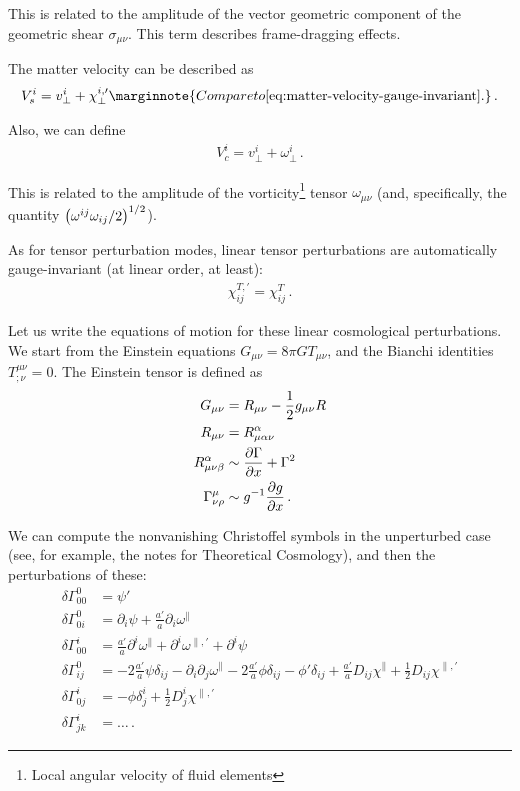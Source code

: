 \documentclass[main.tex]{subfiles}
\begin{document}
This is related to the amplitude of the vector geometric component of the geometric shear \(\sigma_{\mu \nu }\). 
This term describes frame-dragging effects. 

The matter velocity can be described as 
%
\begin{align}
V^{i}_{s} = v^{i}_{\perp} + \chi^{i, \prime}_{\perp}
\marginnote{Compare to \eqref{eq:matter-velocity-gauge-invariant}.}
\,.
\end{align}

Also, we can define 
%
\begin{align}
V^{i}_{c} = v^{i}_{\perp} + \omega^{i}_{\perp}
\,.
\end{align}

This is related to the amplitude of the vorticity\footnote{Local angular velocity of fluid elements} tensor \(\omega_{\mu \nu }\) (and, specifically, the quantity \(\qty(\omega^{ij} \omega_{ij} / 2)^{1/2}\)). 

As for tensor perturbation modes, linear tensor perturbations are automatically gauge-invariant (at linear order, at least): 
%
\begin{align}
\chi^{T, \prime}_{ij} =
\chi^{T}_{ij} 
\,.
\end{align}

Let us write the equations of motion for these linear cosmological perturbations. 
We start from the Einstein equations \(G_{\mu \nu } = 8 \pi G T_{\mu \nu }\), and the Bianchi identities \(T^{\mu \nu }_{; \nu } = 0\). 
The Einstein tensor is defined as 
%
\begin{align}
G_{\mu \nu } &= R_{\mu \nu } - \frac{1}{2} g_{\mu \nu } R  \\
R_{\mu \nu } &= R^{\alpha }_{\mu \alpha \nu }  \\
R^{\alpha }_{\mu \nu \beta }&\sim \pdv{\Gamma }{x} + \Gamma^2  \\
\Gamma^{\mu }_{\nu \rho } &\sim g^{-1} \pdv{g}{x}
\,.
\end{align}

We can compute the nonvanishing Christoffel symbols in the unperturbed case (see, for example, the notes for Theoretical Cosmology), and then the perturbations of these: 
%
\begin{align}
\delta \Gamma^{0}_{00} &= \psi '  \\
\delta \Gamma^{0}_{0i} &= \partial_{i} \psi + \frac{a'}{a} \partial_{i} \omega^{\parallel}  \\
\delta \Gamma^{i}_{00} &= \frac{a'}{a} \partial^{i} \omega^{\parallel} + \partial^{i} \omega^{\parallel, \prime} + \partial^{i} \psi  \\
\delta \Gamma^{0}_{ij} &= -2 \frac{a'}{a} \psi \delta_{ij} - \partial_{i} \partial_{j} \omega^{\parallel} - 2 \frac{a'}{a} \phi \delta_{ij} 
- \phi ' \delta_{ij} + \frac{a'}{a} D_{ij} \chi^{\parallel} + \frac{1}{2} D_{ij} \chi^{\parallel, \prime}  \\
\delta \Gamma^{i}_{0j} &= - \phi \delta^{i}_{j} + \frac{1}{2} D^{i}_{j} \chi^{\parallel, \prime}  \\
\delta \Gamma^{i}_{jk} &= \dots
\,.
\end{align}
\end{document}
